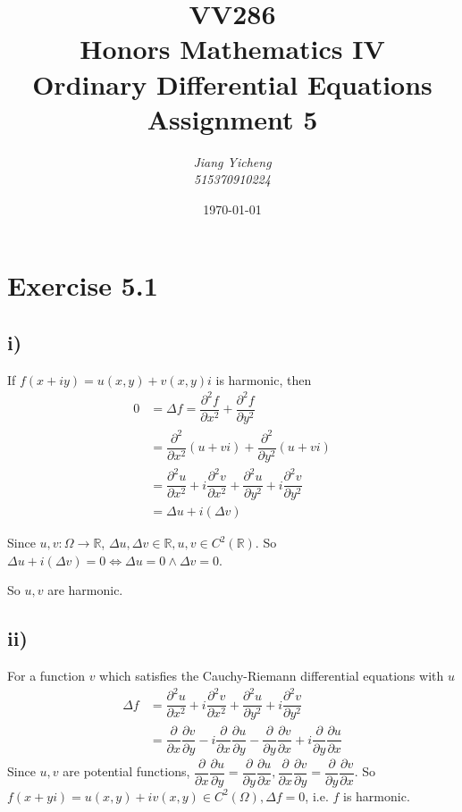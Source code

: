 \documentclass[a4paper,12pt,titlepage]{article}
\author{\textit{Jiang Yicheng}\\\textit{515370910224}}
\title{\textbf{VV286\\ Honors Mathematics IV\\
Ordinary Differential Equations\\
		Assignment 5}}
\date{\today}
\begin{document}
\maketitle

\section*{Exercise 5.1}
\subsection*{i)}
If $f(x+iy)=u(x,y)+v(x,y)i$ is harmonic, then
\begin{align*}
0&=\Delta f=\dfrac{\partial^2 f}{\partial x^2}+\dfrac{\partial^2 f}{\partial y^2}\\
&=\dfrac{\partial^2 }{\partial x^2}(u+vi)+\dfrac{\partial^2 }{\partial y^2}(u+vi)\\
&=\dfrac{\partial^2 u}{\partial x^2}+i\dfrac{\partial^2 v}{\partial x^2}+\dfrac{\partial^2 u}{\partial y^2}+i\dfrac{\partial^2 v}{\partial y^2}\\
&=\Delta u +i(\Delta v)
\end{align*}

Since $u,v:\Omega\rightarrow \mathbb{R}$, $\Delta u,\Delta v\in\mathbb{R},u,v\in C^2(\mathbb{R})$. So $\Delta u +i(\Delta v)=0\Leftrightarrow \Delta u=0\wedge \Delta v=0$.

So $u,v$ are harmonic.


\subsection*{ii)}
For a function $v$ which satisfies the Cauchy-Riemann differential equations with $u$
\begin{align*}
\Delta f&=\dfrac{\partial^2 u}{\partial x^2}+i\dfrac{\partial^2 v}{\partial x^2}+\dfrac{\partial^2 u}{\partial y^2}+i\dfrac{\partial^2 v}{\partial y^2}\\
&=\dfrac{\partial }{\partial x}\dfrac{\partial v}{\partial y}-i\dfrac{\partial }{\partial x}\dfrac{\partial u}{\partial y} -\dfrac{\partial }{\partial y}\dfrac{\partial v}{\partial x}+i\dfrac{\partial }{\partial y}\dfrac{\partial u}{\partial x}
\end{align*}
Since $u,v$ are potential functions, $\dfrac{\partial }{\partial x}\dfrac{\partial u}{\partial y}=\dfrac{\partial }{\partial y}\dfrac{\partial u}{\partial x},\dfrac{\partial }{\partial x}\dfrac{\partial v}{\partial y}=\dfrac{\partial }{\partial y}\dfrac{\partial v}{\partial x}$. So $f(x+yi)=u(x,y)+iv(x,y)\in C^2(\Omega), \Delta f=0$, i.e. $f$ is harmonic.
\end{document}
